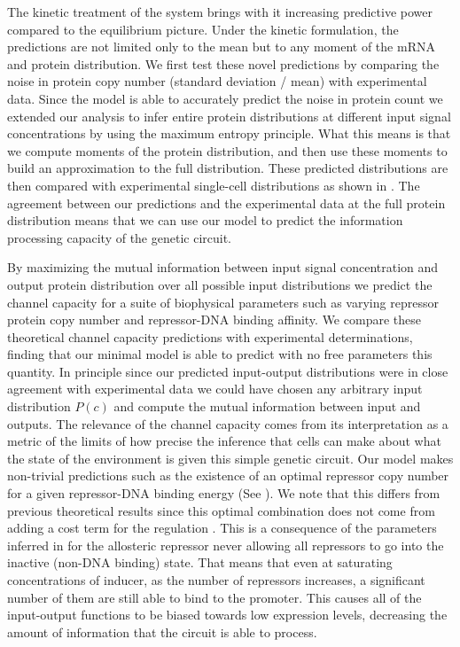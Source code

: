 The kinetic treatment of the system brings with it increasing predictive power
compared to the equilibrium picture. Under the kinetic formulation, the
predictions are not limited only to the mean but to any moment of the mRNA and
protein distribution. We first test these novel predictions by comparing the
noise in protein copy number (standard deviation / mean) with experimental data.
Since the model is able to accurately predict the noise in protein count we
extended our analysis to infer entire protein distributions at different input
signal concentrations by using the maximum entropy principle. What this means is
that we compute moments of the protein distribution, and then use these
moments to build an approximation to the full distribution. These predicted
distributions are then compared with experimental single-cell distributions as
shown in . The agreement between our predictions and the
experimental data at the full protein distribution means that we can use our
model to predict the information processing capacity of the genetic circuit.

By maximizing the mutual information between input signal concentration and
output protein distribution over all possible input distributions we predict
the channel capacity for a suite of biophysical parameters such as varying
repressor protein copy number and repressor-DNA binding affinity. We compare
these theoretical channel capacity predictions with experimental determinations,
finding that our minimal model is able to predict with no free parameters this
quantity. In principle since our predicted input-output distributions were in
close agreement with experimental data we could have chosen any arbitrary input
distribution $P(c)$ and compute the mutual information between input and
outputs. The relevance of the channel capacity comes from its interpretation as
a metric of the limits of how precise the inference that cells can make about
what the state of the environment is given this simple genetic circuit. Our
model makes non-trivial predictions such as the existence of an optimal
repressor copy number for a given repressor-DNA binding energy (See
). We note that this differs from previous theoretical
results since this optimal combination does not come from adding a cost term for
the regulation \cite{Tkacik2011}. This is a consequence of the parameters
inferred in \cite{Razo-Mejia2018} for the allosteric repressor never allowing
all repressors to go into the inactive (non-DNA binding) state. That means that
even at saturating concentrations of inducer, as the number of repressors
increases, a significant number of them are still able to bind to the promoter.
This causes all of the input-output functions to be biased towards low
expression levels, decreasing the amount of information that the circuit is able
to process.

